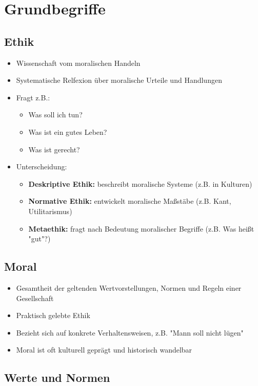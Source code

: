
\section{Grundbegriffe}


\subsection{Ethik}

\begin{itemize}
    \item Wissenschaft vom moralischen Handeln
    \item Systematische Relfexion über moralische Urteile und Handlungen
    \item Fragt z.B.:
    \begin{itemize}
        \item Was soll ich tun?
        \item Was ist ein gutes Leben?
        \item Was ist gerecht?
    \end{itemize}
    \item Unterscheidung:
    \begin{itemize}
        \item \textbf{Deskriptive Ethik:} beschreibt moralische Systeme (z.B. in Kulturen)
        \item \textbf{Normative Ethik:} entwickelt moralische Maßstäbe (z.B. Kant, Utilitarismus)
        \item \textbf{Metaethik:} fragt nach Bedeutung moralischer Begriffe (z.B. Was heißt "gut"?)
    \end{itemize}
\end{itemize}

\subsection{Moral}

\begin{itemize}
    \item Gesamtheit der geltenden Wertvorstellungen, Normen und Regeln einer Gesellschaft
    \item Praktisch gelebte Ethik
    \item Bezieht sich auf konkrete Verhaltensweisen, z.B. "Mann soll nicht lügen"
    \item Moral ist oft kulturell geprägt und historisch wandelbar
\end{itemize}

\subsection{Werte und Normen}

